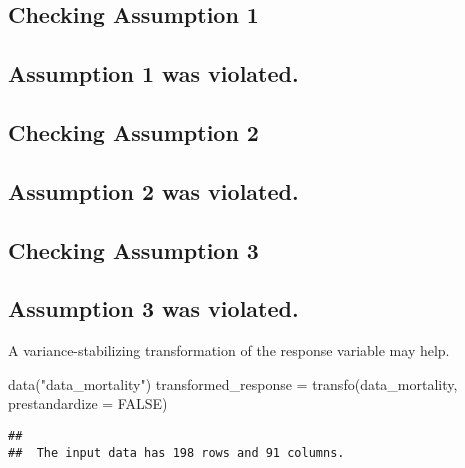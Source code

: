 \documentclass[
]{book}
\newenvironment{Shaded}{\begin{snugshade}}{\end{snugshade}}
\newcommand{\AttributeTok}[1]{\textcolor[rgb]{0.77,0.63,0.00}{#1}}
\newcommand{\ConstantTok}[1]{\textcolor[rgb]{0.00,0.00,0.00}{#1}}
\newcommand{\FunctionTok}[1]{\textcolor[rgb]{0.00,0.00,0.00}{#1}}
\newcommand{\NormalTok}[1]{#1}
\newcommand{\OtherTok}[1]{\textcolor[rgb]{0.56,0.35,0.01}{#1}}
\newcommand{\StringTok}[1]{\textcolor[rgb]{0.31,0.60,0.02}{#1}}
\begin{document}
\hypertarget{checking-assumption-1}{%
\subsection{Checking Assumption 1}\label{checking-assumption-1}}

\hypertarget{assumption-1-was-violated.}{%
\subsection{Assumption 1 was violated.}\label{assumption-1-was-violated.}}

\hypertarget{checking-assumption-2}{%
\subsection{Checking Assumption 2}\label{checking-assumption-2}}

\hypertarget{assumption-2-was-violated.}{%
\subsection{Assumption 2 was violated.}\label{assumption-2-was-violated.}}

\hypertarget{checking-assumption-3}{%
\subsection{Checking Assumption 3}\label{checking-assumption-3}}

\hypertarget{assumption-3-was-violated.}{%
\subsection{Assumption 3 was violated.}\label{assumption-3-was-violated.}}

A variance-stabilizing transformation of the response variable may help.

\begin{Shaded}
\begin{Highlighting}[]
\FunctionTok{data}\NormalTok{(}\StringTok{"data\_mortality"}\NormalTok{)}
\NormalTok{transformed\_response }\OtherTok{=} \FunctionTok{transfo}\NormalTok{(data\_mortality, }\AttributeTok{prestandardize =} \ConstantTok{FALSE}\NormalTok{)}
\end{Highlighting}
\end{Shaded}

\begin{verbatim}
##  
##  The input data has 198 rows and 91 columns.
\end{verbatim}
\end{document}
